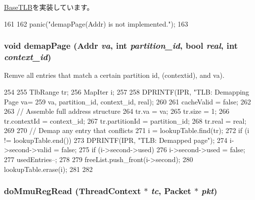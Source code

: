 \hyperlink{classBaseTLB_aff4b9d01b9a4712c699cfb2dd9b3b8cd}{BaseTLB}を実装しています。


\begin{DoxyCode}
161     {
162         panic("demapPage(Addr) is not implemented.\n");
163     }
\end{DoxyCode}
\hypertarget{classSparcISA_1_1TLB_a81a25ef373ef91ac81bb1717e4c9dcb0}{
\subsubsection[{demapPage}]{\setlength{\rightskip}{0pt plus 5cm}void demapPage ({\bf Addr} {\em va}, \/  int {\em partition\_\-id}, \/  bool {\em real}, \/  int {\em context\_\-id})}}
\label{classSparcISA_1_1TLB_a81a25ef373ef91ac81bb1717e4c9dcb0}
Remve all entries that match a certain partition id, (contextid), and va). 


\begin{DoxyCode}
254 {
255     TlbRange tr;
256     MapIter i;
257 
258     DPRINTF(IPR, "TLB: Demapping Page va=%
259             va, partition_id, context_id, real);
260 
261     cacheValid = false;
262 
263     // Assemble full address structure
264     tr.va = va;
265     tr.size = 1;
266     tr.contextId = context_id;
267     tr.partitionId = partition_id;
268     tr.real = real;
269 
270     // Demap any entry that conflicts
271     i = lookupTable.find(tr);
272     if (i != lookupTable.end()) {
273         DPRINTF(IPR, "TLB: Demapped page\n");
274         i->second->valid = false;
275         if (i->second->used) {
276             i->second->used = false;
277             usedEntries--;
278         }
279         freeList.push_front(i->second);
280         lookupTable.erase(i);
281     }
282 }
\end{DoxyCode}
\hypertarget{classSparcISA_1_1TLB_ac90a1eb3091d70b4d1465154d799db46}{
\subsubsection[{doMmuRegRead}]{ doMmuRegRead ({\bf ThreadContext} $\ast$ {\em tc}, \/  {\bf Packet} $\ast$ {\em pkt})}}
\label{classSparcISA_1_1TLB_ac90a1eb3091d70b4d1465154d799db46}



